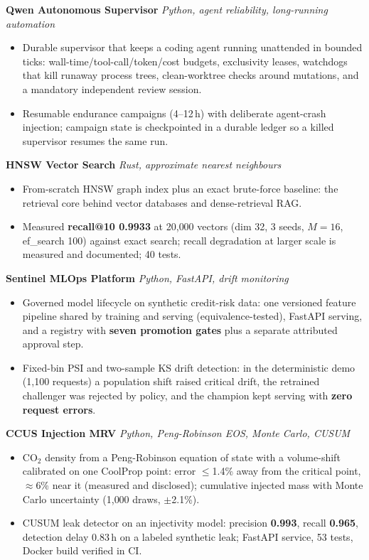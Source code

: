 \documentclass[10pt]{article}
\newcommand{\projectentry}[2]{%
  \noindent\textbf{#1} \hfill \textit{#2}\\[-0.3em]
}
\begin{document}
\projectentry{Qwen Autonomous Supervisor}{Python, agent reliability, long-running automation}
\begin{itemize}
  \item Durable supervisor that keeps a coding agent running unattended in bounded ticks: wall-time/tool-call/token/cost budgets, exclusivity leases, watchdogs that kill runaway process trees, clean-worktree checks around mutations, and a mandatory independent review session.
  \item Resumable endurance campaigns (4--12\,h) with deliberate agent-crash injection; campaign state is checkpointed in a durable ledger so a killed supervisor resumes the same run.
\end{itemize}

\projectentry{HNSW Vector Search}{Rust, approximate nearest neighbours}
\begin{itemize}
  \item From-scratch HNSW graph index plus an exact brute-force baseline: the retrieval core behind vector databases and dense-retrieval RAG.
  \item Measured \textbf{recall@10 0.9933} at 20{,}000 vectors (dim 32, 3 seeds, $M{=}16$, ef\_search 100) against exact search; recall degradation at larger scale is measured and documented; 40 tests.
\end{itemize}

\projectentry{Sentinel MLOps Platform}{Python, FastAPI, drift monitoring}
\begin{itemize}
  \item Governed model lifecycle on synthetic credit-risk data: one versioned feature pipeline shared by training and serving (equivalence-tested), FastAPI serving, and a registry with \textbf{seven promotion gates} plus a separate attributed approval step.
  \item Fixed-bin PSI and two-sample KS drift detection: in the deterministic demo (1{,}100 requests) a population shift raised critical drift, the retrained challenger was rejected by policy, and the champion kept serving with \textbf{zero request errors}.
\end{itemize}

\projectentry{CCUS Injection MRV}{Python, Peng-Robinson EOS, Monte Carlo, CUSUM}
\begin{itemize}
  \item CO$_2$ density from a Peng-Robinson equation of state with a volume-shift calibrated on one CoolProp point: error $\leq$1.4\% away from the critical point, $\approx$6\% near it (measured and disclosed); cumulative injected mass with Monte Carlo uncertainty (1{,}000 draws, $\pm$2.1\%).
  \item CUSUM leak detector on an injectivity model: precision \textbf{0.993}, recall \textbf{0.965}, detection delay 0.83\,h on a labeled synthetic leak; FastAPI service, 53 tests, Docker build verified in CI.
\end{itemize}
\end{document}
